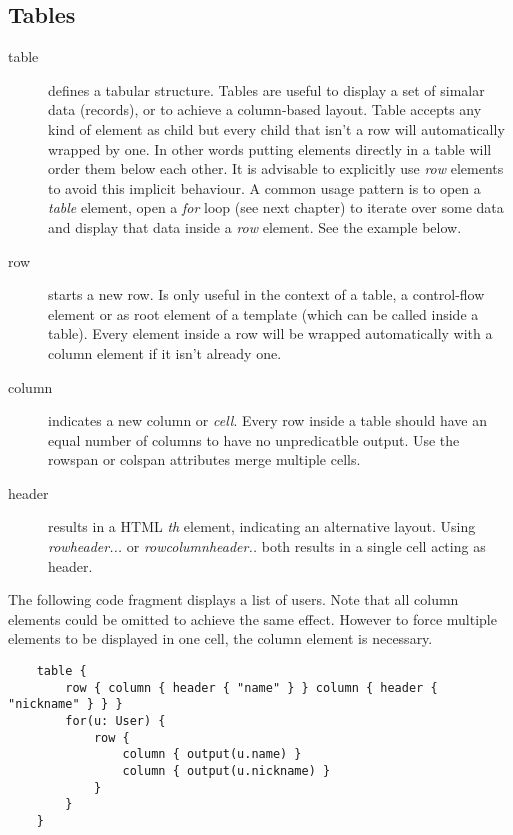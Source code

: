 \subsection{Tables}
\begin{description}
	\item[table{}] defines a tabular structure. Tables are useful to display a set of simalar data (records), or to achieve a column-based layout. Table accepts any kind of element as child but every child that isn't a row will automatically wrapped by one. In other words putting elements directly in a table will order them below each other. It is advisable to explicitly use \emph{row} elements to avoid this implicit behaviour. A common usage pattern is to open a \emph{table} element, open a \emph{for} loop (see next chapter) to iterate over some data and display that data inside a \emph{row} element. See the example below. 
	\item[row{}] starts a new row. Is only useful in the context of a table, a control-flow element or as root element of a template (which can be called inside a table). Every element inside a row will be wrapped automatically with a column element if it isn't already one. 
	\item[column{}] indicates a new column or \emph{cell}. Every row inside a table should have an equal number of columns to have no unpredicatble output. Use the rowspan or colspan attributes merge multiple cells. 
	\item[header{}] results in a HTML \emph{th} element, indicating an alternative layout. Using \emph{row{header{...}}} or \emph{row{column{header{..}}}} both results in a single cell acting as header. 
\end{description}
The following code fragment displays a list of users. Note that all column elements could be omitted to achieve the same effect. However to force multiple elements to be displayed in one cell, the column element is necessary. 
\begin{lstlisting}
	table {
		row { column { header { "name" } } column { header { "nickname" } } }
		for(u: User) {
			row { 
				column { output(u.name) } 
				column { output(u.nickname) }
			}
		}
	}
\end{lstlisting}

